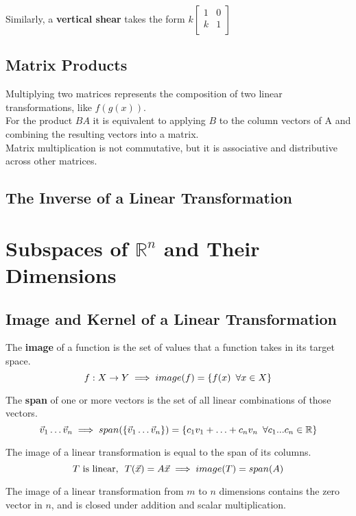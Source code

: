 \documentclass[]{scrartcl}
\begin{document}
	Similarly, a \textbf{vertical shear} takes the form $k\begin{bmatrix}
	1 & 0 \\
	k & 1 \\
	\end{bmatrix}$\\
	
	\subsection{Matrix Products}
	Multiplying two matrices represents the composition of two linear transformations, like $f(g(x))$.\\ 
	
	For the product $BA$ it is equivalent to applying $B$ to the column vectors of A and combining the resulting vectors into a matrix.\\
	
	Matrix multiplication is not commutative, but it is associative and distributive across other matrices.
	
	\subsection{The Inverse of a Linear Transformation}
		
	\setcounter{section}{2}
	\section{Subspaces of $\mathbb{R}^n$ and Their Dimensions}
	\subsection{Image and Kernel of a Linear Transformation}
	The \textbf{image} of a function is the set of values that a function takes in its target space.
	$$
	f: X \rightarrow Y \implies image(f) = \{ f(x) \enskip \forall x \in X \}
	$$
	
	The \textbf{span} of one or more vectors is the set of all linear combinations of those vectors.
	$$
	\vec{v}_{1} \ldots \vec{v}_{n} \implies span(\{\vec{v}_{1} \ldots \vec{v}_{n}\}) = \{
	c_{1}v_{1} + \ldots + c_{n}v_{n} \enskip \forall  c_{1}...c_{n} \in \mathbb{R}
	\}
	$$
	
	 The image of a linear transformation is equal to the span of its columns.
	$$
	T \text{ is linear}, \enskip T(\vec{x}) = A\vec{x} \implies image(T) = span(A)
	$$
	
	The image of a linear transformation from $m$ to $n$ dimensions contains the zero vector in $n$, and is closed under addition and scalar multiplication.\\
	
\end{document}
